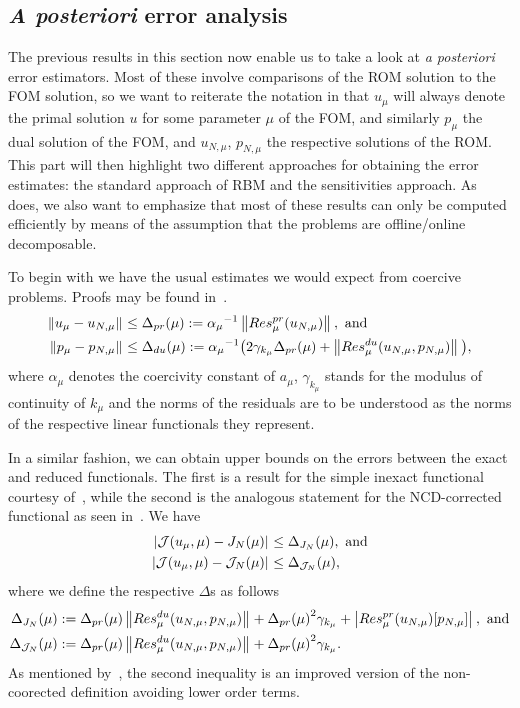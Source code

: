 \subsection{\textit{A posteriori} error analysis}

The previous results in this section now enable us to take a look at \textit{a posteriori} error estimators.
Most of these involve comparisons of the ROM solution to the FOM solution, so we want to reiterate the notation in that $u_\mu$ will always denote the primal solution $u$ for some parameter $\mu$ of the FOM, and similarly $p_\mu$ the dual solution of the FOM, and $u_{N, \mu}$, $p_{N, \mu}$ the respective solutions of the ROM.\@
This part will then highlight two different approaches for obtaining the error estimates: the standard approach of RBM and the sensitivities approach.
As~\cite{Keil2021} does, we also want to emphasize that most of these results can only be computed efficiently by means of the assumption that the problems are offline/online decomposable.

To begin with we have the usual estimates we would expect from coercive problems.
Proofs may be found in~\cite{Rozza2008, Qian2017}.
\begin{align*}
    \left\lVert u_\mu - u_{N, \mu}\right\rVert_{} &\leq \Delta_{pr}(\mu) := {\alpha_\mu}^{-1} \left\lVert Res_\mu^{pr}(u_{N, \mu})\right\rVert_{}, \text{ and} \\
    \left\lVert p_\mu - p_{N, \mu}\right\rVert_{} &\leq \Delta_{du}(\mu) := {\alpha_\mu}^{-1} \big( 2 \gamma_{k_\mu} \Delta_{pr}(\mu) + \left\lVert Res_\mu^{du}(u_{N, \mu}, p_{N, \mu})\right\rVert_{} \big),
\end{align*}
where $\alpha_\mu$ denotes the coercivity constant of $a_\mu$, $\gamma_{k_\mu}$ stands for the modulus of continuity of $k_\mu$ and the norms of the residuals are to be understood as the norms of the respective linear functionals they represent.

In a similar fashion, we can obtain upper bounds on the errors between the exact and reduced functionals.
The first is a result for the simple inexact functional courtesy of~\cite[Theorem 4]{Qian2017}, while the second is the analogous statement for the NCD-corrected functional as seen in~\cite[Proposition 3.6]{Keil2021}.
We have
\begin{align*}
    \left\lvert\mathcal{J}(u_\mu, \mu) - J_N(\mu)\right\rvert_{} &\leq \Delta_{J_N}(\mu), \text{ and} \\
    \left\lvert\mathcal{J}(u_\mu, \mu) - \mathcal{J}_N(\mu)\right\rvert_{} &\leq \Delta_{\mathcal{J}_N}(\mu),
\end{align*}
where we define the respective $\Delta$s as follows
\begin{align*}
    \Delta_{J_N}(\mu) &:= \Delta_{pr}(\mu) \left\lVert Res_\mu^{du}(u_{N, \mu}, p_{N, \mu})\right\rVert_{} + {\Delta_{pr}(\mu)}^2 \gamma_{k_\mu} + \left\lvert Res_\mu^{pr}(u_{N, \mu})[p_{N, \mu}]\right\rvert_{}, \text{ and} \\
    \Delta_{\mathcal{J}_N}(\mu) &:= \Delta_{pr}(\mu) \left\lVert Res_\mu^{du}(u_{N, \mu}, p_{N, \mu})\right\rVert_{} + {\Delta_{pr}(\mu)}^2 \gamma_{k_\mu}.
\end{align*}
As mentioned by~\cite{Keil2021}, the second inequality is an improved version of the non-coorected definition avoiding lower order terms.

